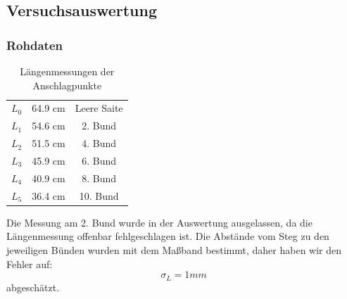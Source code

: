 \documentclass[12pt,a4paper]{article}
\begin{document}
\subsection{Versuchsauswertung}

\subsubsection{Rohdaten}
\begin{table}[H]\centering
\caption{Längenmessungen der Anschlagpunkte}
\begin{tabular}{c|c|c}
$L_0$ & 64.9 cm & Leere Saite\\ 
$L_1$ & 54.6 cm & 2. Bund \\ 
$L_2$ & 51.5 cm & 4. Bund \\ 
$L_3$ & 45.9 cm & 6. Bund \\ 
$L_4$ & 40.9 cm & 8. Bund \\ 
$L_5$ & 36.4 cm & 10. Bund \\ 
\end{tabular} 
\end{table}
Die Messung am 2. Bund wurde in der Auswertung ausgelassen, da die Längenmessung offenbar fehlgeschlagen ist. Die Abstände vom Steg zu den jeweiligen Bünden wurden mit dem Maßband bestimmt, daher haben wir den Fehler auf:
\begin{equation*}
\sigma_L=1 mm
\end{equation*}
abgeschätzt.
\end{document}
